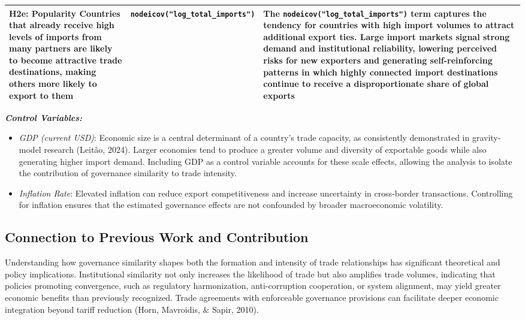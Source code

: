 \documentclass[
]{article}
\begin{document}
\begin{longtable}{p{} p{} p{}}
\textbf{H2e: Popularity}  
Countries that already receive high levels of imports from many partners are likely to become attractive trade destinations, making others more likely to export to them
&
\texttt{nodeicov("log\_total\_imports")}

&
The \texttt{nodeicov("log\_total\_imports")} term captures the tendency for countries with high import volumes to attract additional export ties. Large import markets signal strong demand and institutional reliability, lowering perceived risks for new exporters and generating self-reinforcing patterns in which highly connected import destinations continue to receive a disproportionate share of global exports
\\
\hline

\end{longtable}

\textbf{\emph{Control Variables:}}

\begin{itemize}
\item
  \emph{GDP (current USD)}: Economic size is a central determinant of a
  country's trade capacity, as consistently demonstrated in
  gravity-model research (Leitão, 2024). Larger economies tend to
  produce a greater volume and diversity of exportable goods while also
  generating higher import demand. Including GDP as a control variable
  accounts for these scale effects, allowing the analysis to isolate the
  contribution of governance similarity to trade intensity.
\item
  \emph{Inflation Rate}: Elevated inflation can reduce export
  competitiveness and increase uncertainty in cross-border transactions.
  Controlling for inflation ensures that the estimated governance
  effects are not confounded by broader macroeconomic volatility.
\end{itemize}

\subsection{Connection to Previous Work and
Contribution}\label{connection-to-previous-work-and-contribution}

Understanding how governance similarity shapes both the formation and
intensity of trade relationships has significant theoretical and policy
implications. Institutional similarity not only increases the likelihood
of trade but also amplifies trade volumes, indicating that policies
promoting convergence, such as regulatory harmonization, anti-corruption
cooperation, or system alignment, may yield greater economic benefits
than previously recognized. Trade agreements with enforceable governance
provisions can facilitate deeper economic integration beyond tariff
reduction (Horn, Mavroidis, \& Sapir, 2010).
\end{document}
